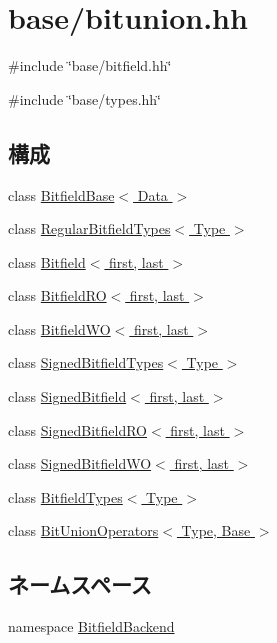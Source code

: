 \hypertarget{bitunion_8hh}{
\section{base/bitunion.hh}
\label{bitunion_8hh}
}
{\ttfamily \#include \char`\"{}base/bitfield.hh\char`\"{}}\par
{\ttfamily \#include \char`\"{}base/types.hh\char`\"{}}\par
\subsection*{構成}
\begin{DoxyCompactItemize}
\item 
class \hyperlink{classBitfieldBackend_1_1BitfieldBase}{BitfieldBase$<$ Data $>$}
\item 
class \hyperlink{classBitfieldBackend_1_1RegularBitfieldTypes}{RegularBitfieldTypes$<$ Type $>$}
\item 
class \hyperlink{classBitfieldBackend_1_1RegularBitfieldTypes_1_1Bitfield}{Bitfield$<$ first, last $>$}
\item 
class \hyperlink{classBitfieldBackend_1_1RegularBitfieldTypes_1_1BitfieldRO}{BitfieldRO$<$ first, last $>$}
\item 
class \hyperlink{classBitfieldBackend_1_1RegularBitfieldTypes_1_1BitfieldWO}{BitfieldWO$<$ first, last $>$}
\item 
class \hyperlink{classBitfieldBackend_1_1SignedBitfieldTypes}{SignedBitfieldTypes$<$ Type $>$}
\item 
class \hyperlink{classBitfieldBackend_1_1SignedBitfieldTypes_1_1SignedBitfield}{SignedBitfield$<$ first, last $>$}
\item 
class \hyperlink{classBitfieldBackend_1_1SignedBitfieldTypes_1_1SignedBitfieldRO}{SignedBitfieldRO$<$ first, last $>$}
\item 
class \hyperlink{classBitfieldBackend_1_1SignedBitfieldTypes_1_1SignedBitfieldWO}{SignedBitfieldWO$<$ first, last $>$}
\item 
class \hyperlink{classBitfieldBackend_1_1BitfieldTypes}{BitfieldTypes$<$ Type $>$}
\item 
class \hyperlink{classBitfieldBackend_1_1BitUnionOperators}{BitUnionOperators$<$ Type, Base $>$}
\end{DoxyCompactItemize}
\subsection*{ネームスペース}
\begin{DoxyCompactItemize}
\item 
namespace \hyperlink{namespaceBitfieldBackend}{BitfieldBackend}
\end{DoxyCompactItemize}
